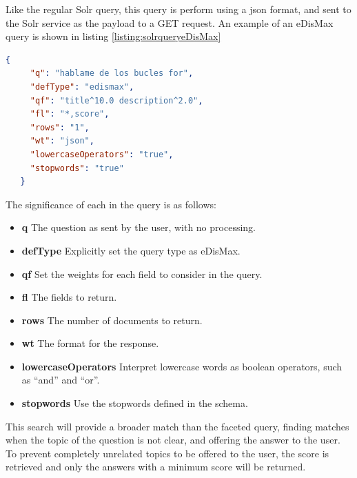 Like the regular Solr query, this query is perform using a json format, and sent to the Solr service as the payload to a GET request. An example of an \ac{eDisMax} query is shown in listing \ref{listing:solrqueryeDisMax}

\begin{center} 
  \begin{lstlisting}[language=json, caption=Example \ac{eDisMax} query for Solr, label=listing:solrqueryeDisMax]
   {
     "q": "hablame de los bucles for",
     "defType": "edismax",
     "qf": "title^10.0 description^2.0",
     "fl": "*,score",
     "rows": "1",
     "wt": "json",
     "lowercaseOperators": "true",
     "stopwords": "true"
   }  
  \end{lstlisting}
\end{center}

The significance of each in the query is as follows:

\begin{itemize}
 \item \textbf{q} The question as sent by the user, with no processing.
 \item \textbf{defType} Explicitly set the query type as \ac{eDisMax}.
 \item \textbf{qf} Set the weights for each field to consider in the query.
 \item \textbf{fl} The fields to return.
 \item \textbf{rows} The number of documents to return.
 \item \textbf{wt} The format for the response.
 \item \textbf{lowercaseOperators} Interpret lowercase words as boolean operators, such as ``and'' and ``or''.
 \item \textbf{stopwords} Use the stopwords defined in the schema.
\end{itemize}

This search will provide a broader match than the faceted query, finding matches when the topic of the question is not clear, and offering the answer to the user. To prevent completely unrelated topics to be offered to the user, the score is retrieved and only the answers with a minimum score will be returned.
